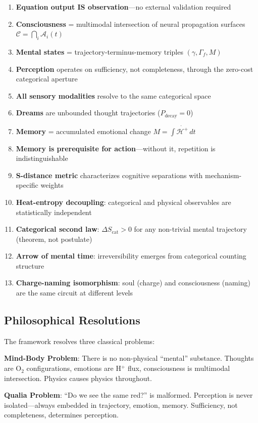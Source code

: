 \documentclass[aps,prd,twocolumn,superscriptaddress,floatfix,nofootinbib]{revtex4-2}
\theoremstyle{remark}
\newcommand{\Ccat}{\mathcal{C}}
\newcommand{\Gstate}{\Gamma}
\newcommand{\Hfield}{\mathcal{H}^+}
\newcommand{\Pdecay}{P_{\mathrm{decay}}}
\newcommand{\Scatent}{S_{\mathrm{cat}}}
\begin{document}
\begin{enumerate}
\item \textbf{Equation output IS observation}---no external validation required
\item \textbf{Consciousness} = multimodal intersection of neural propagation surfaces $\Ccat = \bigcap_i \mathcal{A}_i(t)$
\item \textbf{Mental states} = trajectory-terminus-memory triples $(\gamma, \Gstate_f, M)$
\item \textbf{Perception} operates on sufficiency, not completeness, through the zero-cost categorical aperture
\item \textbf{All sensory modalities} resolve to the same categorical space
\item \textbf{Dreams} are unbounded thought trajectories ($\Pdecay = 0$)
\item \textbf{Memory} = accumulated emotional change $M = \int \dot{\Hfield} \, dt$
\item \textbf{Memory is prerequisite for action}---without it, repetition is indistinguishable
\item \textbf{S-distance metric} characterizes cognitive separations with mechanism-specific weights
\item \textbf{Heat-entropy decoupling}: categorical and physical observables are statistically independent
\item \textbf{Categorical second law}: $\Delta \Scatent > 0$ for any non-trivial mental trajectory (theorem, not postulate)
\item \textbf{Arrow of mental time}: irreversibility emerges from categorical counting structure
\item \textbf{Charge-naming isomorphism}: soul (charge) and consciousness (naming) are the same circuit at different levels
\end{enumerate}

\subsection{Philosophical Resolutions}

The framework resolves three classical problems:

\textbf{Mind-Body Problem}: There is no non-physical ``mental'' substance. Thoughts are O$_2$ configurations, emotions are H$^+$ flux, consciousness is multimodal intersection. Physics causes physics throughout.

\textbf{Qualia Problem}: ``Do we see the same red?'' is malformed. Perception is never isolated---always embedded in trajectory, emotion, memory. Sufficiency, not completeness, determines perception.
\end{document}
